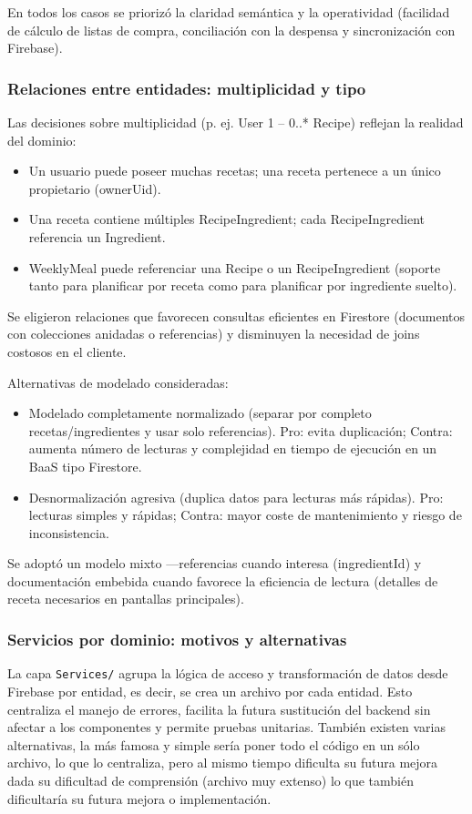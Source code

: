 \documentclass[twoside, openright, 11pt]{report}
\begin{document}
			
				En todos los casos se priorizó la claridad semántica y la operatividad (facilidad de cálculo de listas de compra, conciliación con la despensa y sincronización con Firebase).
			
			\subsubsection{Relaciones entre entidades: multiplicidad y tipo}
				Las decisiones sobre multiplicidad (p. ej. User 1 -- 0..* Recipe) reflejan la realidad del dominio:
				\begin{itemize}
					\item Un usuario puede poseer muchas recetas; una receta pertenece a un único propietario (ownerUid).
					\item Una receta contiene múltiples RecipeIngredient; cada RecipeIngredient referencia un Ingredient.
					\item WeeklyMeal puede referenciar una Recipe o un RecipeIngredient (soporte tanto para planificar por receta como para planificar por ingrediente suelto).
				\end{itemize}
				Se eligieron relaciones que favorecen consultas eficientes en Firestore (documentos con colecciones anidadas o referencias) y disminuyen la necesidad de joins costosos en el cliente.
			
				Alternativas de modelado consideradas:
				\begin{itemize}
					\item Modelado completamente normalizado (separar por completo recetas/ingredientes y usar solo referencias). Pro: evita duplicación; Contra: aumenta número de lecturas y complejidad en tiempo de ejecución en un BaaS tipo Firestore.
					\item Desnormalización agresiva (duplica datos para lecturas más rápidas). Pro: lecturas simples y rápidas; Contra: mayor coste de mantenimiento y riesgo de inconsistencia.
				\end{itemize}
				Se adoptó un modelo mixto —referencias cuando interesa (ingredientId) y documentación embebida cuando favorece la eficiencia de lectura (detalles de receta necesarios en pantallas principales).
			
			\subsubsection{Servicios por dominio: motivos y alternativas}
				La capa \texttt{Services/} agrupa la lógica de acceso y transformación de datos desde Firebase por entidad, es decir, se crea un archivo por cada entidad.
				Esto centraliza el manejo de errores, facilita la futura sustitución del backend sin afectar a los componentes y permite pruebas unitarias. También existen varias alternativas, la más famosa y simple sería poner todo el código en un sólo archivo, lo que lo centraliza, pero al mismo tiempo dificulta su futura mejora dada su dificultad de comprensión (archivo muy extenso) lo que también dificultaría su futura mejora o implementación.
			
\end{document}
